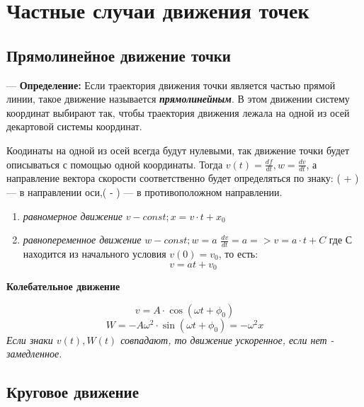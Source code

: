 \documentclass[12pt,a4paper]{report}
\begin{document}
\section{Частные случаи движения точек}
\subsection{Прямолинейное движение точки}
--- \textbf{Определение:} Если траектория движения точки является частью прямой линии, такое движение называется \textbf{\textit{прямолинейным}}. В этом движении систему координат выбирают так, чтобы траектория движения лежала на одной из осей декартовой системы координат.

\vspace{5px}

Коодинаты на одной из осей всегда будут нулевыми, так движение точки будет описываться с помощью одной координаты. Тогда $ v(t) = \frac{df}{dt}, w =\frac{dv}{dt}$,  а направление вектора скорости соответственно будет определяться по знаку: ( + ) --- в направлении оси,( - ) --- в противоположном направлении.
\begin{enumerate}
    \item \textit{равномерное движение} $v - const; x = v \cdot t + x_0 $
    \item \textit{равнопеременное движение} $w - const; w = a$
          $\frac{dv}{dt} = a => v = a \cdot t + C $ где С находится из начального условия $v(0) = v_0$, то есть:
          \[ v = at+v_0\]
\end{enumerate}

\vspace{10px}

\textbf{Колебательное движение}

\[ v = A \cdot \cos{(\omega t+ \phi_0)}\]
\[ W = -A\omega ^2 \cdot \sin{(\omega t+\phi_0)} = -\omega^2x \]
\textit{Если знаки $v(t) , W(t)$ совпадают, то движение ускоренное, если нет - замедленное.}
\subsection{Круговое движение}
\end{document}
